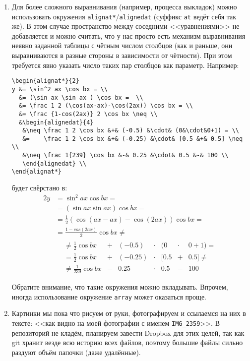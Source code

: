 \begin{enumerate}
\item
	Для более сложного выравнивания (например, процесса выкладок) можно использовать
	окружения \texttt{alignat*}/\texttt{alignedat} (суффикс \texttt{at} ведёт себя так же).
	В этом случае пространство между соседними <<уравнениями>> не добавляется и можно
	считать, что у нас просто есть механизм выравнивания неявно заданной таблицы с чётным
	числом столбцов (как и раньше, они выравниваются в разные стороны в зависимости от чётности).
	При этом требуется явно указать число таких пар столбцов как параметр.
	Например:
\begin{verbatim}
\begin{alignat*}{2}
y &= \sin^2 ax \cos bx = \\
  &= (\sin ax \sin ax ) \cos bx =  \\
  &= \frac 1 2 (\cos(ax-ax)-\cos(2ax)) \cos bx = \\
  &= \frac {1-cos(2ax)} 2 \cos bx \neq \\
  &\begin{alignedat}{4}
   &\neq \frac 1 2 \cos bx &+& (-0.5) &\cdot& (0&\cdot&0+1) = \\
   &=    \frac 1 2 \cos bx &+& (-0.25) &\cdot& [0.5 &+& 0.5] \neq \\
   &\neq \frac 1{239} \cos bx &-& 0.25 &\cdot& 0.5 &-& 100 \\
   \end{alignedat} \\
\end{alignat*}
\end{verbatim}
будет свёрстано в:
\begin{alignat*}{2}
y &= \sin^2 ax \cos bx = \\
  &= (\sin ax \sin ax ) \cos bx =  \\
  &= \frac 1 2 (\cos(ax-ax)-\cos(2ax)) \cos bx = \\
  &= \frac {1-cos(2ax)} 2 \cos bx \neq \\
  &\begin{alignedat}{4}
   &\neq \frac 1 2 \cos bx &+& (-0.5) &\cdot& (0&\cdot&0+1) = \\
   &=    \frac 1 2 \cos bx &+& (-0.25) &\cdot& [0.5 &+& 0.5] \neq \\
   &\neq \frac 1{239} \cos bx &-& 0.25 &\cdot& 0.5 &-& 100 \\
   \end{alignedat} \\
\end{alignat*}
	Обратите внимание, что такие окружения можно вкладывать.
	Впрочем, иногда использование окружение \texttt{array} может оказаться проще.

\item
	Картинки мы пока что рисуем от руки, фотографируем и ссылаемся на них в тексте:
	<<как видно	на моей фотографии с именем \texttt{IMG\_2359}>>.
	В репозиторий не кладём, планируем завести Dropbox для этих целей, так как git
	хранит везде всю историю всех файлов, поэтому большие файлы сильно раздуют
	объём папочки (даже удалённые).

\end{enumerate}

